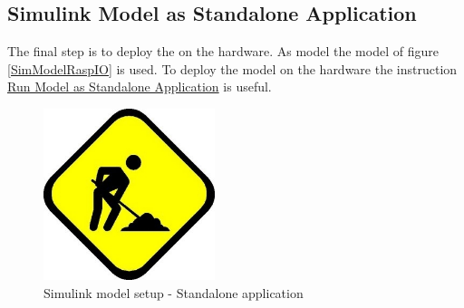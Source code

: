 \documentclass[Bachelorarbeit.tex]{subfiles}
\begin{document}
\subsection{Simulink Model as Standalone Application}
The final step is to deploy the on the hardware. As model the model of figure \ref{SimModelRaspIO} is used. To deploy the model on the hardware the instruction \href{https://de.mathworks.com/help/supportpkg/rtlsdrradio/ug/run-model-as-standalone-application.html}{Run Model as Standalone Application} is useful.

\begin{figure}[!h]
\centering
\includegraphics[width=5cm]{./img/Under_construction.JPG} 
\caption{Simulink model setup - Standalone application}
\label{SimModelWithIO}
\end{figure}
\end{document}
